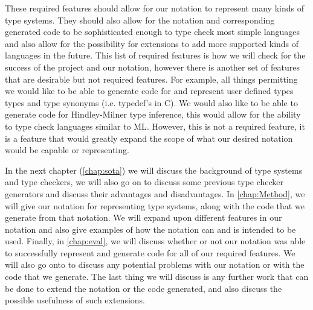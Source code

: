 These required features should allow for our notation to represent many kinds of type systems.
They should also allow for the notation and corresponding generated code to be sophisticated enough to type check most simple languages and also allow for the possibility for extensions to add more supported kinds of languages in the future.
This list of required features is how we will check for the success of the project and our notation, however there is another set of features that are desirable but not required features.
For example, all things permitting we would like to be able to generate code for and represent user defined types types and type synonyms (i.e. typedef's in C\cite{kernighan2006c}).
We would also like to be able to generate code for Hindley-Milner type inference\cite{MILNER1978348}, this would allow for the ability to type check languages similar to ML\cite{milner1997definition}. 
However, this is not a required feature, it is a feature that would greatly expand the scope of what our desired notation would be capable or representing.

In the next chapter (\autoref{chap:sota}) we will discuss the background of type systems and type checkers, we will also go on to discuss some previous type checker generators and discuss their advantages and disadvantages.
In \autoref{chap:Method}, we will give our notation for representing type systems, along with the code that we generate from that notation.
We will expand upon different features in our notation and also give examples of how the notation can and is intended to be used.
Finally, in \autoref{chap:eval}, we will discuss whether or not our notation was able to successfully represent and generate code for all of our required features.
We will also go onto to discuss any potential problems with our notation or with the code that we generate.
The last thing we will discuss is any further work that can be done to extend the notation or the code generated, and also discuss the possible usefulness of such extensions.
